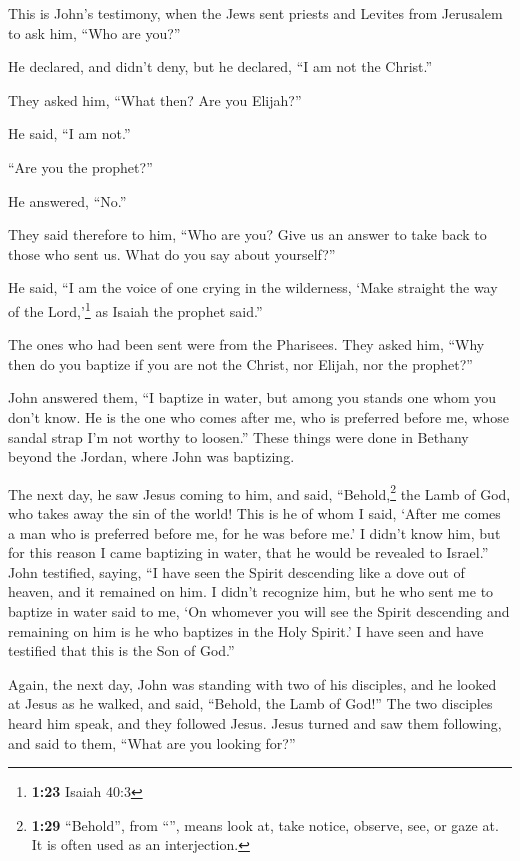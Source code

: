  This is John's testimony, when the Jews sent priests and
Levites from Jerusalem to ask him, ``Who are you?''

 He declared, and didn't deny, but he declared, ``I am
not the Christ.''

 They asked him, ``What then? Are you Elijah?''

He said, ``I am not.''

``Are you the prophet?''

He answered, ``No.''

 They said therefore to him, ``Who are you? Give us an
answer to take back to those who sent us. What do you say about
yourself?''

 He said, ``I am the voice of one crying in the
wilderness, `Make straight the way of the Lord,'\footnote{\textbf{1:23}
  Isaiah 40:3} as Isaiah the prophet said.''

 The ones who had been sent were from the Pharisees.
 They asked him, ``Why then do you baptize if you are not
the Christ, nor Elijah, nor the prophet?''

 John answered them, ``I baptize in water, but among you
stands one whom you don't know.  He is the one who comes
after me, who is preferred before me, whose sandal strap I'm not worthy
to loosen.''  These things were done in Bethany beyond
the Jordan, where John was baptizing.

 The next day, he saw Jesus coming to him, and said,
``Behold,\footnote{\textbf{1:29} ``Behold'', from ``'',
  means look at, take notice, observe, see, or gaze at. It is often used
  as an interjection.} the Lamb of God, who takes away the sin of the
world!  This is he of whom I said, `After me comes a man
who is preferred before me, for he was before me.'  I
didn't know him, but for this reason I came baptizing in water, that he
would be revealed to Israel.''  John testified, saying,
``I have seen the Spirit descending like a dove out of heaven, and it
remained on him.  I didn't recognize him, but he who sent
me to baptize in water said to me, `On whomever you will see the Spirit
descending and remaining on him is he who baptizes in the Holy Spirit.'
 I have seen and have testified that this is the Son of
God.''

 Again, the next day, John was standing with two of his
disciples,  and he looked at Jesus as he walked, and
said, ``Behold, the Lamb of God!''  The two disciples
heard him speak, and they followed Jesus.  Jesus turned
and saw them following, and said to them, ``What are you looking for?''


